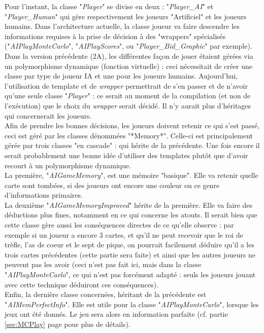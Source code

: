 \documentclass[a4paper,11pt]{article}
\begin{document}
Pour l'instant, la classe "\textit{Player}" se divise en deux : "\textit{Player\_AI}" et "\textit{Player\_Human}" qui gère respectivement les joueurs "Artificiel" et les joueurs humains. Dans l'architecture actuelle, la classe joueur va faire descendre les informations requises à la prise de décision à des "wrappers" spécialisés ("\textit{AIPlayMonteCarlo}", "\textit{AIPlayScores}", ou "\textit{Player\_Bid\_Graphic}" par exemple). Dans la version précédente (2A), les différentes façon de jouer étaient gérées via un polymorphisme dynamique (fonction virtuelle) : ceci nécessitait de créer une classe par type de joueur IA et une pour les joueurs humains. Aujourd'hui, l'utilisation de template et de \textit{wrapper} permettrait de s'en passer et de n'avoir qu'une seule classe "\textit{Player}" : ce serait au moment de la compilation (et non de l'exécution) que le choix du \textit{wrapper} serait décidé. Il n'y aurait plus d'héritages qui concernerait les joueurs. \\

Afin de prendre les bonnes décisions, les joueurs doivent retenir ce qui s'est passé, ceci est géré par les classes dénommées "*Memory*". Celle-ci est principalement gérée par trois classes "en cascade" : qui hérite de la précédente. Une fois encore il serait probablement une bonne idée d'utiliser des templates plutôt que d'avoir recourt à un polymorphisme dynamique.\\
La première, "\textit{AIGameMemory}", est une mémoire "basique". Elle va retenir quelle carte sont tombées, si des joueurs ont encore une couleur ou ce genre d'informations primaires. \\
La deuxième "\textit{AIGameMemoryImproved}" hérite de la première. Elle va faire des déductions plus fines, notamment en ce qui concerne les atouts. Il serait bien que cette classe gère aussi les conséquences directes de ce qu'elle observe  : par exemple si un joueur a encore 3 cartes, et qu'il ne peut recevoir que le roi de trèfle, l'as de coeur et le sept de pique, on pourrait facilement déduire qu'il a les trois cartes précédentes (cette partie sera faite) et ainsi que les autres joueurs ne peuvent pas les avoir (ceci n'est pas fait ici, mais dans la classe "\textit{AIPlayMonteCarlo}", ce qui n'est pas forcément adapté : seuls les joueurs jouant avec cette technique déduiront ces conséquences). \\
Enfin, la dernière classe concernées, héritant de la précédente est "\textit{AIMemPerfectInfo}". Elle est utile pour la classe "\textit{AIPlayMonteCarlo}", lorsque les jeux ont été donnés. Le jeu sera alors en information parfaite (cf. partie \ref{sec:MCPlay} page \pageref{sec:MCPlay} pour plus de détails).
\end{document}
